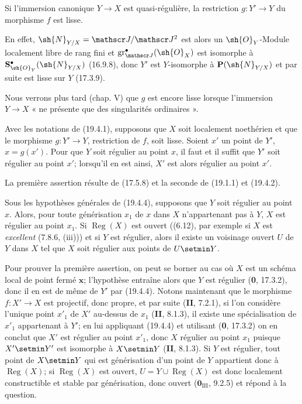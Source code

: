 \begin{corollary}[19.4.3]
\label{IV.19.4.3}
Si l'immersion canonique $Y\to X$ est quasi-régulière, la restriction $g:Y'\to Y$ du morphisme $f$ est lisse.
\end{corollary}

En effet, $\sh{N}_{Y/X}=\mathscr J/\mathscr J^2$ est alors un $\sh{O}_Y$-Module localement libre de rang fini et $\operatorname{gr}_{\mathscr J}^\bullet(\sh{O}_X)$ est isomorphe à $\mathbf S_{\sh{O}_Y}^\bullet(\sh{N}_{Y/X})$ (16.9.8), donc $Y'$ est $Y$-isomorphe à $\mathbf P(\sh{N}_{Y/X})$ et par suite est lisse sur $Y$ (17.3.9).

Nous verrons plus tard (chap. V) que $g$ est encore lisse lorsque l'immersion $Y\to X$ « ne présente que des singularités ordinaires ».

\begin{proposition}[19.4.4]
\label{IV.19.4.4}
Avec les notations de \textup{(19.4.1)}, supposons que $X$ soit localement noethérien et que le morphisme $g:Y'\to Y$, restriction de $f$, soit lisse. Soient $x'$ un point de $Y'$, $x=g(x')$. Pour que $Y$ soit régulier au point $x$, il faut et il suffit que $Y'$ soit régulier au point $x'$; lorsqu'il en est ainsi, $X'$ est alors régulier au point $x'$.
\end{proposition}

La première assertion résulte de (17.5.8) et la seconde de (19.1.1) et (19.4.2).

\begin{corollary}[19.4.5]
\label{IV.19.4.5}
Sous les hypothèses générales de \textup{(19.4.4)}, supposons que $Y$ soit régulier au point $x$. Alors, pour toute générisation $x_1$ de $x$ dans $X$ n'appartenant pas à $Y$, $X$ est régulier au point $x_1$. Si $\operatorname{Reg}(X)$ est ouvert \textup{((6.12), par exemple si $X$ est \emph{excellent} (7.8.6, (iii)))}
et si $Y$ est régulier, alors il existe un voisinage ouvert $U$ de $Y$ dans $X$ tel que $X$ soit régulier aux points de $U\setmin Y$.
\end{corollary}

Pour prouver la première assertion, on peut se borner au cas où $X$ est un schéma local de point fermé $\boldsymbol{x}$; l'hypothèse entraîne alors que $Y$ est régulier (\textbf{0}, 17.3.2), donc il en est de même de $Y'$ par (19.4.4). Notons maintenant que le morphisme $f:X'\to X$ est projectif, donc propre, et par suite (\textbf{II}, 7.2.1), si l'on considère l'unique point $x'_1$ de $X'$ au-dessus de $x_1$ (\textbf{II}, 8.1.3), il existe une spécialisation de $x'_1$ appartenant à $Y'$; en lui appliquant (19.4.4) et utilisant (\textbf{0}, 17.3.2) on en conclut que $X'$ est régulier au point $x'_1$, donc $X$ régulier au point $x_1$ puisque $X'\setmin Y'$ est isomorphe à $X\setmin Y$ (\textbf{II}, 8.1.3). Si $Y$ est régulier, tout point de $X\setmin Y$ qui est générisation d'un point de $Y$ appartient donc à $\operatorname{Reg}(X)$; si $\operatorname{Reg}(X)$ est ouvert, $U=Y\cup\operatorname{Reg}(X)$ est donc localement constructible et stable par générisation, donc ouvert ($\mathbf{0}_{\mathrm{III}}$, 9.2.5) et répond à la question.

